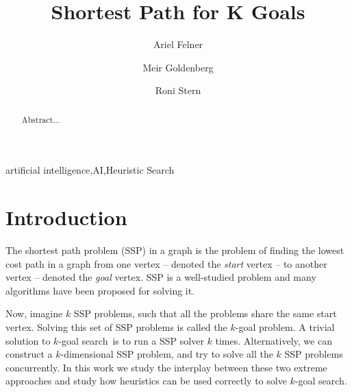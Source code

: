 \documentclass{aicom2e}
\newcommand{\kgs}{$k$-goal search}
\begin{document}
\begin{frontmatter}                           %
%
\title{Shortest Path for K Goals}
\maketitle
%
\author[]{Ariel Felner}
\address{Ben Gurion University of the Negev\\ Be'er Sheva, Israel\\
    E-mail: felner@bgu.ac.il}

\author[]{Meir Goldenberg}
\address{The Jerusalem College of Technology\\ Jerusalem, Israel\\
    E-mail: mgoldenbe@gmail.com}
\author[]{Roni Stern}
\address{Ben Gurion University of the Negev\\ Be'er Sheva, Israel\\
    E-mail: roni.stern@gmail.com}

\begin{abstract}
Abstract...

\end{abstract}

\begin{keyword}
artificial intelligence\sep AI\sep Heuristic Search
\end{keyword}
%
\end{frontmatter}

\section*{Introduction}


The shortest path problem (SSP) in a graph is the problem of finding the lowest cost path in a graph from one vertex -- denoted the {\em start} vertex -- to another vertex -- denoted the {\em goal} vertex.
SSP is a well-studied problem and many algorithms have been proposed for solving it.

Now, imagine $k$ SSP problems, such that all the problems share the same start vertex.
Solving this set of SSP problems is called the $k$-goal problem.
A trivial solution to \kgs\ is to run a SSP solver $k$ times. Alternatively,
we can construct a $k$-dimensional SSP problem, and try to solve all the $k$ SSP problems concurrently.
In this work we study the interplay between these two extreme approaches and
study how heuristics can be used correctly to solve \kgs.
\end{document}
